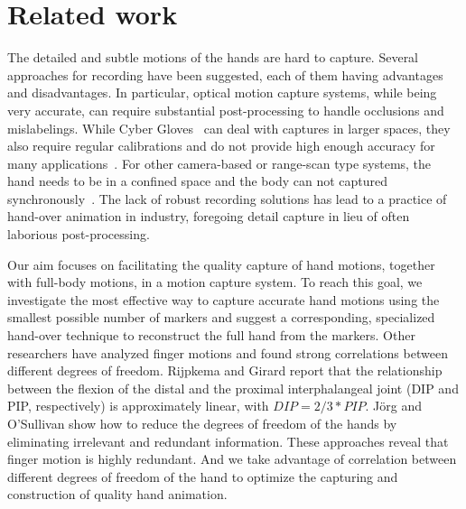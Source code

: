 
\section{Related work}

The detailed and subtle motions of the hands are hard to capture. Several approaches for recording have been suggested, each of them having advantages and disadvantages. In particular, optical motion capture systems, while being very accurate, can require substantial post-processing to handle occlusions and mislabelings. While Cyber Gloves~ can deal with captures in larger spaces, they also require regular calibrations and do not provide high enough accuracy for many applications~\cite{KahZacKle04}. For other camera-based or range-scan type systems, the hand needs to be in a confined space and the body can not captured synchronously~\cite{WanPop09,ZhaChaXu12}.   The lack of robust recording solutions has lead to a practice of
hand-over animation in industry, foregoing detail capture in lieu of often laborious post-processing.

Our aim focuses on facilitating the quality capture of hand motions, together with full-body motions, in a motion capture system. To reach this goal, we investigate the most effective way to capture accurate hand motions using the smallest possible number of markers and suggest a corresponding, specialized hand-over technique to reconstruct the full hand from the markers. Other researchers have analyzed finger motions and found strong correlations between different degrees of freedom. Rijpkema and Girard  report that the relationship between the flexion of the distal and the proximal interphalangeal joint (DIP and PIP, respectively) is approximately linear, with $DIP=2/3*PIP$. J\"{o}rg and O'Sullivan  show how to reduce the degrees of freedom of the hands by eliminating irrelevant and redundant information. These approaches reveal that finger motion is highly redundant. And we take advantage of  correlation between different degrees of freedom of the hand to optimize the capturing and construction of quality hand animation.

